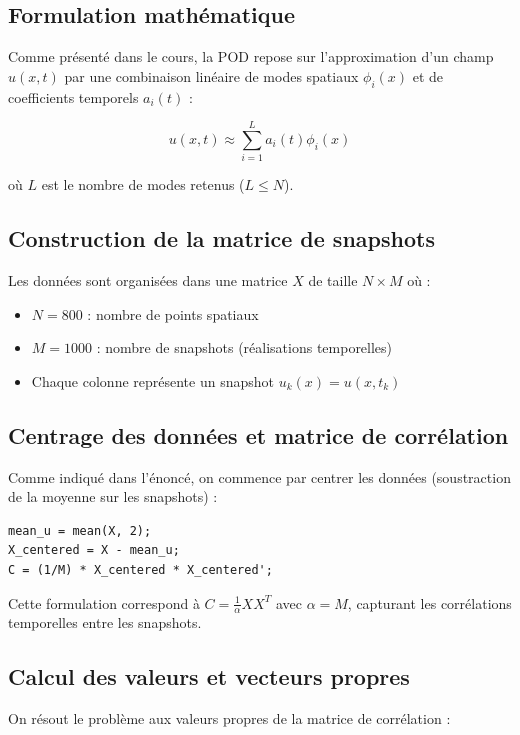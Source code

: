 \documentclass{rapportECL}
\begin{document}
\subsection{Formulation mathématique}
Comme présenté dans le cours, la POD repose sur l'approximation d'un champ \( u(x,t) \) par une combinaison linéaire de modes spatiaux \( \phi_i(x) \) et de coefficients temporels \( a_i(t) \) :

\[
u(x,t) \approx \sum_{i=1}^{L} a_i(t) \phi_i(x)
\]

où \( L \) est le nombre de modes retenus (\( L \leq N \)).

\subsection{Construction de la matrice de snapshots}
Les données sont organisées dans une matrice \( X \) de taille \( N \times M \) où :
\begin{itemize}
    \item \( N = 800 \) : nombre de points spatiaux
    \item \( M = 1000 \) : nombre de snapshots (réalisations temporelles)
    \item Chaque colonne représente un snapshot \( u_k(x) = u(x,t_k) \)
\end{itemize}

\subsection{Centrage des données et matrice de corrélation}
Comme indiqué dans l'énoncé, on commence par centrer les données (soustraction de la moyenne sur les snapshots) :

\begin{lstlisting}[caption={Centrage des données et calcul de la matrice de corrélation}, label=code:centering]
mean_u = mean(X, 2);
X_centered = X - mean_u;
C = (1/M) * X_centered * X_centered';
\end{lstlisting}

Cette formulation correspond à \( C = \frac{1}{\alpha} XX^T \) avec \( \alpha = M \), capturant les corrélations temporelles entre les snapshots.

\subsection{Calcul des valeurs et vecteurs propres}
On résout le problème aux valeurs propres de la matrice de corrélation :
\end{document}
